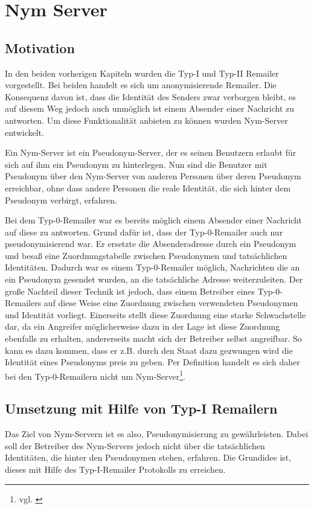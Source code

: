 \chapter{Nym Server}

\section{Motivation}
In den beiden vorherigen Kapiteln wurden die Typ-I und Typ-II Remailer vorgestellt. Bei beiden handelt es sich um anonymisierende Remailer. Die Konsequenz davon ist, dass die Identität des Senders zwar verborgen bleibt, es auf diesem Weg jedoch auch unmöglich ist einem Absender einer Nachricht zu antworten. Um diese Funktionalität anbieten zu können wurden Nym-Server entwickelt.

Ein Nym-Server ist ein Pseudonym-Server, der es seinen Benutzern erlaubt für sich auf ihm ein Pseudonym zu hinterlegen. Nun sind die Benutzer mit Pseudonym über den Nym-Server von anderen Personen über deren Pseudonym erreichbar, ohne dass andere Personen die reale Identität, die sich hinter dem Pseudonym verbirgt, erfahren.

Bei dem Typ-0-Remailer war es bereits möglich einem Absender einer Nachricht auf diese zu antworten. Grund dafür ist, dass der Typ-0-Remailer auch nur pseudonymisierend war. Er ersetzte die Absenderadresse durch ein Pseudonym und besaß eine Zuordnungstabelle zwischen Pseudonymen und tatsächlichen Identitäten. Dadurch war es einem Typ-0-Remailer möglich, Nachrichten die an ein Pseudonym gesendet wurden, an die tatsächliche Adresse weiterzuleiten. Der große Nachteil dieser Technik ist jedoch, dass einem Betreiber eines Typ-0-Remailers auf diese Weise eine Zuordnung zwischen verwendeten Pseudonymen und Identität vorliegt. Einerseits stellt diese Zuordnung eine starke Schwachstelle dar, da ein Angreifer möglicherweise dazu in der Lage ist diese Zuordnung ebenfalls zu erhalten, andererseits macht sich der Betreiber selbst angreifbar. So kann es dazu kommen, dass er z.B. durch den Staat dazu gezwungen wird die Identität eines Pseudonyms preis zu geben. Per Definition handelt es sich daher bei den Typ-0-Remailern nicht um Nym-Server\footnote{vgl. \cite{nymdefinition}}.

\section{Umsetzung mit Hilfe von Typ-I Remailern}
Das Ziel von Nym-Servern ist es also, Pseudonymisierung zu gewährleisten. Dabei soll der Betreiber des Nym-Servers jedoch nicht über die tatsächlichen Identitäten, die hinter den Pseudonymen stehen, erfahren. Die Grundidee ist, dieses mit Hilfe des Typ-I-Remailer Protokolls zu erreichen.

